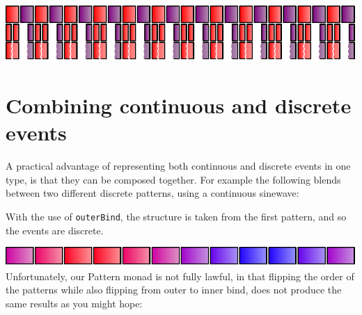\includegraphics{../figures/fig6.pdf}\\

\section{Combining continuous and discrete
events}\label{combining-continuous-and-discrete-events}

A practical advantage of representing both continuous and discrete
events in one type, is that they can be composed together. For example
the following blends between two different discrete patterns, using a
continuous sinewave:

\begin{Shaded}
\begin{Highlighting}[]
\OtherTok{=}
         \OtherTok{{-}\textgreater{}}
         \OtherTok{{-}\textgreater{}}
         \OtherTok{{-}\textgreater{}}  \OperatorTok{$}\OperatorTok{+}\NormalTok{)}\OperatorTok{/}
\end{Highlighting}
\end{Shaded}

With the use of \texttt{outerBind}, the structure is taken from the
first pattern, and so the events are discrete.

\includegraphics{../figures/fig7.pdf}\\

Unfortunately, our Pattern monad is not fully lawful, in that flipping
the order of the patterns while also flipping from outer to inner bind,
does not produce the same results as you might hope:

